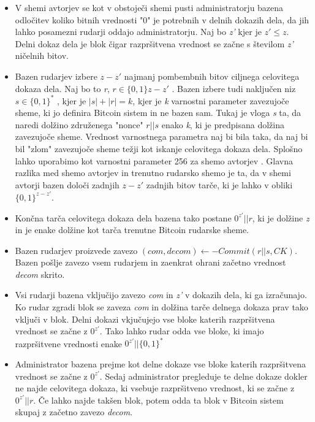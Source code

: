 \documentclass[12pt]{article}
\begin{document}
\begin{itemize}
	\item V shemi avtorjev se kot v obstoječi shemi pusti administratorju bazena odločitev koliko bitnih vrednosti "0" je potrebnih v delnih dokazih dela, da jih lahko posamezni rudarji oddajo administratorju. Naj bo \textit{z'} kjer je \textit{$z' \le z$}. Delni dokaz dela je blok čigar razpršitvena vrednost se začne s številom \textit{z'} ničelnih bitov.
	\item Bazen rudarjev izbere \textit{$z - z'$} najmanj pombembnih bitov ciljnega celovitega dokaza dela. Naj bo to \textit{r}, $r \in \{0, 1\} z - z'$ . Bazen izbere tudi naključen niz $s \in \{0, 1\}^*$ , kjer je \textit{$ |s| + |r| = k$}, kjer je \textit{k} varnostni parameter zavezujoče sheme, ki jo definira Bitcoin sistem in ne bazen sam. Tukaj je vloga \textit{s} ta, da naredi dolžino združenega "nonce" \textit{$r||s$} enako \textit{k}, ki je predpisana dolžina zavezujoče sheme. Vrednost varnostnega parametra naj bi bila taka, da naj bi bil "zlom" zavezujoče sheme težji kot iskanje celovitega dokaza dela. Splošno lahko uporabimo kot varnostni parameter 256 za shemo avtorjev \cite{originalarticle}. Glavna razlika med shemo avtorjev in trenutno rudarsko shemo je ta, da v shemi avtorji bazen določi zadnjih \textit{$ z - z' $} zadnjih bitov tarče, ki je lahko v obliki $\{0, 1\}^{z-z'}$.
	\item Končna tarča celovitega dokaza dela bazena tako postane \textit{$0^{z'}||r$}, ki je dolžine \textit{z} in je enake dolžine kot tarča trenutne Bitcoin rudarske sheme.
	\item Bazen rudarjev proizvede zavezo \textit{$(com, decom) \leftarrow - Commit(r||s, CK)$}. Bazen pošlje zavezo vsem rudarjem in zaenkrat ohrani začetno vrednost \textit{decom} skrito.
	\item  Vsi rudarji bazena vključijo zavezo \textit{com} in \textit{z'} v dokazih dela, ki ga izračunajo. Ko rudar zgradi blok se zaveza \textit{com} in dolžina tarče delnega dokaza prav tako vključi v blok. Delni dokazi vkjučujejo vse bloke katerih razpršitvena vrednost se začne z $0^{z'}$. Tako lahko rudar odda vse bloke, ki imajo razpršitvene vrednosti enake $0^{z'}||\{0, 1\}^*$
	\item Administrator bazena prejme kot delne dokaze vse bloke katerih razpršitvena vrednost se začne z $0^{z'}$. Sedaj administrator pregleduje te delne dokaze dokler ne najde celovitega dokaza, ki vsebuje razpršitveno vrednost, ki se začne z $0^{z'}||r$. Če lahko najde takšen blok, potem odda ta blok v Bitcoin sistem skupaj z začetno zavezo \textit{decom}. 

\end{itemize}
\end{document}
